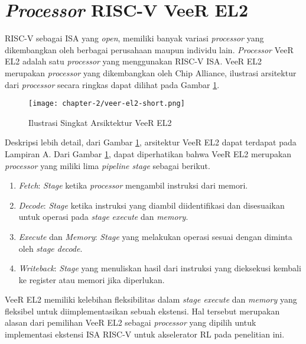 \section{\textit{Processor} RISC-V VeeR EL2}
\label{sub:veer-el2}

RISC-V sebagai \ac{ISA} yang \textit{open}, memiliki banyak variasi \textit{processor} yang dikembangkan oleh berbagai perusahaan maupun individu lain. \textit{Processor} VeeR EL2 \parencite{chip2024cores} adalah satu \textit{processor} yang menggunakan RISC-V \ac{ISA}. VeeR EL2 merupakan \textit{processor} yang dikembangkan oleh Chip Alliance, ilustrasi arsitektur dari \textit{processor} secara ringkas dapat dilihat pada Gambar \ref{fig:veer-el2-short}.

\begin{figure}[h]
	\centering
	\texttt{[image: chapter-2/veer-el2-short.png]}
	\caption{Ilustrasi Singkat Arsiktektur VeeR EL2 \parencite{chip2024cores}}
	\label{fig:veer-el2-short}
\end{figure}

Deskripsi lebih detail, dari Gambar \ref{fig:veer-el2-short}, arsitektur VeeR EL2 dapat terdapat pada Lampiran A. Dari Gambar \ref{fig:veer-el2-short}, dapat diperhatikan bahwa VeeR EL2 merupakan \textit{processor} yang miliki lima \textit{pipeline stage} sebagai berikut.

\begin{enumerate}
	\setlength{\itemsep}{0pt}
	\setlength{\parskip}{0pt}
	\item \textit{Fetch}: \textit{Stage} ketika \textit{processor} mengambil instruksi dari memori.
	\item \textit{Decode}: \textit{Stage} ketika instruksi yang diambil diidentifikasi dan disesuaikan untuk operasi pada \textit{stage} \textit{execute} dan \textit{memory}.
	\item \textit{Execute} dan \textit{Memory}: \textit{Stage} yang melakukan operasi sesuai dengan diminta oleh \textit{stage decode}.
	\item \textit{Writeback}: \textit{Stage} yang menuliskan hasil dari instruksi yang dieksekusi kembali ke register atau memori jika diperlukan.
\end{enumerate}

VeeR EL2 memiliki kelebihan fleksibilitas dalam \textit{stage execute} dan \textit{memory} yang fleksibel untuk diimplementasikan sebuah ekstensi. Hal tersebut merupakan alasan dari pemilihan VeeR EL2 sebagai \textit{processor} yang dipilih untuk implementasi ekstensi \ac{ISA} RISC-V untuk akselerator \ac{RL} pada penelitian ini.
